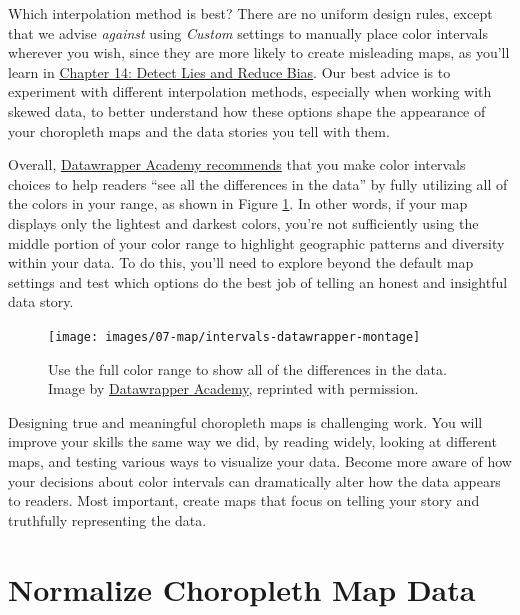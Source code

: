 \documentclass[
  english,
]{book}
\begin{document}
Which interpolation method is best? There are no uniform design rules, except that we advise \emph{against} using \emph{Custom} settings to manually place color intervals wherever you wish, since they are more likely to create misleading maps, as you'll learn in \href{detect.html}{Chapter 14: Detect Lies and Reduce Bias}. Our best advice is to experiment with different interpolation methods, especially when working with skewed data, to better understand how these options shape the appearance of your choropleth maps and the data stories you tell with them.

Overall, \href{https://academy.datawrapper.de/article/134-what-to-consider-when-creating-choropleth-maps}{Datawrapper Academy recommends} that you make color intervals choices to help readers ``see all the differences in the data'' by fully utilizing all of the colors in your range, as shown in Figure \ref{fig:intervals-datawrapper-montage}. In other words, if your map displays only the lightest and darkest colors, you're not sufficiently using the middle portion of your color range to highlight geographic patterns and diversity within your data. To do this, you'll need to explore beyond the default map settings and test which options do the best job of telling an honest and insightful data story.



\begin{figure}
\texttt{[image: images/07-map/intervals-datawrapper-montage]} \caption{Use the full color range to show all of the differences in the data. Image by \href{https://academy.datawrapper.de/article/134-what-to-consider-when-creating-choropleth-maps}{Datawrapper Academy}, reprinted with permission.}\label{fig:intervals-datawrapper-montage}
\end{figure}

Designing true and meaningful choropleth maps is challenging work. You will improve your skills the same way we did, by reading widely, looking at different maps, and testing various ways to visualize your data. Become more aware of how your decisions about color intervals can dramatically alter how the data appears to readers. Most important, create maps that focus on telling your story and truthfully representing the data.

\hypertarget{normalize-choropleth}{%
\section*{Normalize Choropleth Map Data}\label{normalize-choropleth}}
\end{document}
